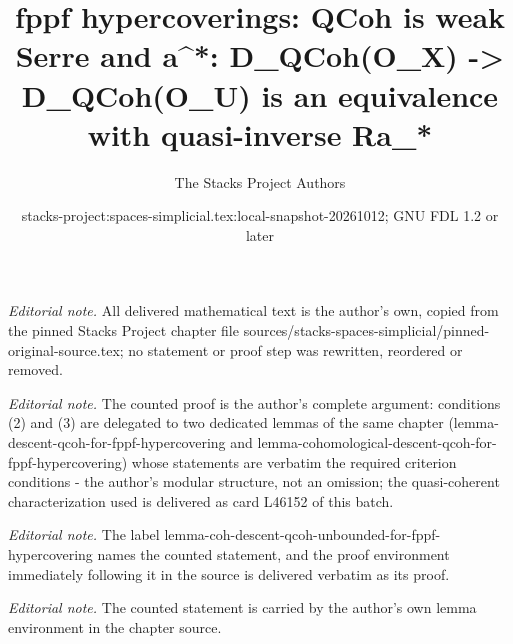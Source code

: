 \documentclass{stacks-project}
\title{fppf hypercoverings: QCoh is weak Serre and a\textasciicircum{}*: D\_QCoh(O\_X) -> D\_QCoh(O\_U) is an equivalence with quasi-inverse Ra\_*}
\author{The Stacks Project Authors}
\date{stacks-project:spaces-simplicial.tex:local-snapshot-20261012; GNU FDL 1.2 or later}
\theoremstyle{plain}
\theoremstyle{definition}
\theoremstyle{remark}
\numberwithin{equation}{subsection}
\begin{document}
\maketitle
\noindent\textit{Editorial note.} All delivered mathematical text is the author's own, copied from the pinned Stacks Project chapter file sources/stacks-spaces-simplicial/pinned-original-source.tex; no statement or proof step was rewritten, reordered or removed.\par\medskip
\noindent\textit{Editorial note.} The counted proof is the author's complete argument: conditions (2) and (3) are delegated to two dedicated lemmas of the same chapter (lemma-descent-qcoh-for-fppf-hypercovering and lemma-cohomological-descent-qcoh-for-fppf-hypercovering) whose statements are verbatim the required criterion conditions - the author's modular structure, not an omission; the quasi-coherent characterization used is delivered as card L46152 of this batch.\par\medskip
\noindent\textit{Editorial note.} The label lemma-coh-descent-qcoh-unbounded-for-fppf-hypercovering names the counted statement, and the proof environment immediately following it in the source is delivered verbatim as its proof.\par\medskip
\noindent\textit{Editorial note.} The counted statement is carried by the author's own lemma environment in the chapter source.\par\medskip
\end{document}
